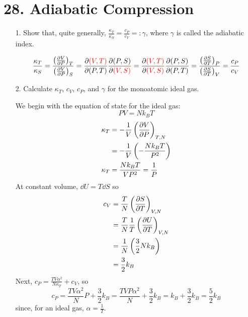 \documentclass[a4paper,twoside]{article}
\begin{document}
\section*{28. Adiabatic Compression}
\begin{itemize}
    \item[1.] Show that, quite generally, $ \frac{\kappa_T}{\kappa_S} = \frac{c_P}{c_V} =\colon \gamma $, where $ \gamma $ is called the adiabatic index.
        \begin{problem}
            \begin{equation}
                \frac{\kappa_T}{\kappa_S} = \frac{\left( \pdv{V}{P} \right)_T}{\left( \pdv{V}{P} \right)_S} = \pdv{\color{red}(V,T)\color{black}}{(P,T)} \pdv{(P,S)}{\color{red}(V,S)\color{black}} = \pdv{\color{red}(V,T)\color{black}}{\color{red}(V,S)\color{black}} \pdv{(P,S)}{(P,T)} = \frac{\left( \pdv{S}{T} \right)_P}{\left( \pdv{S}{T} \right)_V} = \frac{c_P}{c_V}
            \end{equation}
        \end{problem}
    \item[2.] Calculate $ \kappa_T $, $ c_V $, $ c_P $, and $ \gamma $ for the monoatomic ideal gas.
        \begin{problem}
            We begin with the equation of state for the ideal gas:
            \begin{equation}
                PV = N k_B T
            \end{equation}
            \begin{align}
                \kappa_T &= - \frac{1}{V} \left( \pdv{V}{P} \right)_{T,N} \\
                &= - \frac{1}{V} \left( - \frac{Nk_B T}{P^2} \right) \\
                \kappa_T &= \frac{N k_B T}{VP^2} = \frac{1}{P}
            \end{align}
            At constant volume, $ \dd{U} = T \dd{S} $ so
            \begin{align}
                c_V &= \frac{T}{N} \left( \pdv{S}{T} \right)_{V,N} \\
                &= \frac{T}{N} \frac{1}{T} \left( \pdv{U}{T} \right)_{V,N}  \\
                &= \frac{1}{N} \left( \frac{3}{2} N k_B \right) \\
                &= \frac{3}{2} k_B
            \end{align}
            Next, $ c_P = \frac{TV \alpha^2}{N \kappa_T} + c_V $, so
            \begin{equation}
                c_P = \frac{TV \alpha^2}{N} P + \frac{3}{2} k_B = \frac{T V P \alpha^2}{N} + \frac{3}{2} k_B = k_B + \frac{3}{2} k_B = \frac{5}{2} k_B
            \end{equation}
            since, for an ideal gas, $ \alpha = \frac{1}{T} $.


\end{problem}
\end{itemize}
\end{document}
